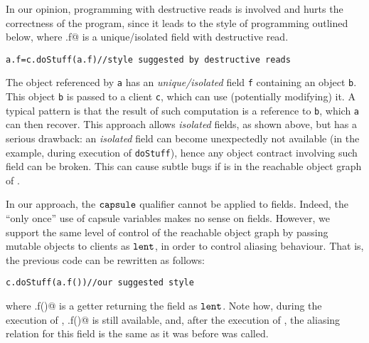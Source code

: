 In our opinion, programming with destructive reads is involved and hurts the correctness of the program, since it leads to the style of programming outlined below, where \Q@a.f@ is a unique/isolated field with destructive read.
\begin{lstlisting}
a.f=c.doStuff(a.f)//style suggested by destructive reads
\end{lstlisting}
The object referenced by \lstinline{a}{} has an \emph{unique/isolated} field \lstinline{f} containing an object \lstinline{b}.
This object \lstinline{b}{} is passed to a client \lstinline{c}{}, which can use (potentially modifying) it. A typical pattern is that the result of such computation is a reference to \lstinline{b}{}, which \lstinline{a}{} can then recover. This approach allows \emph{isolated} fields, as shown above, but has  a serious drawback:
an \emph{isolated} field can become unexpectedly not available (in the example, during execution of \lstinline{doStuff}{}), hence any object contract
involving such field can be broken.
{This can cause {subtle} bugs if \Q@a@ is in the reachable object graph of \Q@c@.}

In our approach, the  $\texttt{capsule}$ qualifier cannot be applied to fields. Indeed, the ``only once'' use of capsule variables 
makes no sense on fields.
{However, we support the same level of control of the reachable object graph by passing mutable objects to clients as $\texttt{lent}$, in order to control aliasing behaviour.
That is, the previous code can be rewritten} as follows:
\begin{lstlisting}
c.doStuff(a.f())//our suggested style
\end{lstlisting}
{where \Q@a.f()@ is a getter returning the field as $\texttt{lent}$.
Note how, during the execution of \Q@doStuff@, \Q@a.f()@ is still available, and,} after the execution of \Q@doStuff@, the aliasing relation {for this field is the same as it was
before \Q@doStuff@ was called.}

